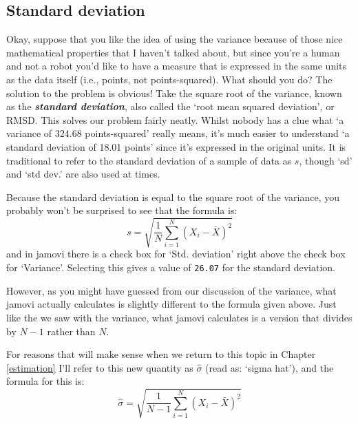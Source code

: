 \documentclass[
]{book}
\begin{document}
\hypertarget{sd}{%
\subsection{Standard deviation}\label{sd}}

Okay, suppose that you like the idea of using the variance because of those nice mathematical properties that I haven't talked about, but since you're a human and not a robot you'd like to have a measure that is expressed in the same units as the data itself (i.e., points, not points-squared). What should you do? The solution to the problem is obvious! Take the square root of the variance, known as the \textbf{\emph{standard deviation}}, also called the `root mean squared deviation', or RMSD. This solves our problem fairly neatly. Whilst nobody has a clue what `a variance of 324.68 points-squared' really means, it's much easier to understand `a standard deviation of 18.01 points' since it's expressed in the original units. It is traditional to refer to the standard deviation of a sample of data as \(s\), though `sd' and `std dev.' are also used at times.

Because the standard deviation is equal to the square root of the variance, you probably won't be surprised to see that the formula is:
\[
s = \sqrt{ \frac{1}{N} \sum_{i=1}^N \left( X_i - \bar{X} \right)^2 }
\]
and in jamovi there is a check box for `Std. deviation' right above the check box for `Variance'. Selecting this gives a value of \texttt{26.07} for the standard deviation.

However, as you might have guessed from our discussion of the variance, what jamovi actually calculates is slightly different to the formula given above. Just like the we saw with the variance, what jamovi calculates is a version that divides by \(N-1\) rather than \(N\).

For reasons that will make sense when we return to this topic in Chapter \ref{estimation} I'll refer to this new quantity as \(\hat\sigma\) (read as: `sigma hat'), and the formula for this is:
\[
\hat\sigma = \sqrt{ \frac{1}{N-1} \sum_{i=1}^N \left( X_i - \bar{X} \right)^2 }
\]
\end{document}
